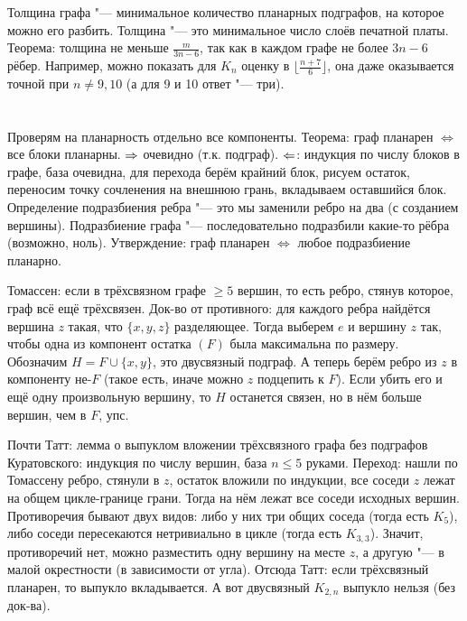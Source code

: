 	Толщина графа "--- минимальное количество планарных подграфов, на которое можно его разбить.
	Толщина "--- это минимальное число слоёв печатной платы.
	Теорема: толщина не меньше $\frac{m}{3n-6}$, так как в каждом графе не более $3n-6$ рёбер.
	Например, можно показать для $K_n$ оценку в $\lfloor\frac{n+7}{6}\rfloor$, она даже оказывается точной при $n \neq 9,10$
	(а для 9 и 10 ответ "--- три).

\section{} %
	Проверям на планарность отдельно все компоненты.
	Теорема: граф планарен $\iff$ все блоки планарны.
	$\Rightarrow$ очевидно (т.к. подграф).
	$\Leftarrow$: индукция по числу блоков в графе, база очевидна, для перехода берём крайний блок, рисуем остаток, переносим точку сочленения на внешнюю грань, вкладываем оставшийся блок.
	Определение подразбиения ребра "--- это мы заменили ребро на два (с созданием вершины).
	Подразбиение графа "--- последовательно подразбили какие-то рёбра (возможно, ноль).
	Утверждение: граф планарен $\iff$ любое подразбиение планарно.

	Томассен: если в трёхсвязном графе $\ge 5$ вершин, то есть ребро, стянув которое, граф всё ещё трёхсвязен.
	Док-во от противного: для каждого ребра найдётся вершина $z$ такая, что $\{x,y,z\}$ разделяющее.
	Тогда выберем $e$ и вершину $z$ так, чтобы одна из компонент остатка $(F)$ была максимальна по размеру.
	Обозначим $H=F\cup\{x, y\}$, это двусвязный подграф.
	А теперь берём ребро из $z$ в компоненту не-$F$ (такое есть, иначе можно $z$ подцепить к $F$).
	Если убить его и ещё одну произвольную вершину, то $H$ останется связен, но в нём больше вершин, чем в $F$, упс.

	Почти Татт:
	лемма о выпуклом вложении трёхсвязного графа без подграфов Куратовского: индукция по числу вершин, база $n \le 5$ руками.
	Переход: нашли по Томассену ребро, стянули в $z$, остаток вложили по индукции, все соседи $z$ лежат на общем цикле-границе грани.
	Тогда на нём лежат все соседи исходных вершин.
	Противоречия бывают двух видов: либо у них три общих соседа (тогда есть $K_5$), либо соседи пересекаются нетривиально в цикле (тогда есть $K_{3,3}$).
	Значит, противоречий нет, можно разместить одну вершину на месте $z$, а другую "--- в малой окрестности (в зависимости от угла).
	Отсюда Татт: если трёхсвязный планарен, то выпукло вкладывается.
	А вот двусвязный $K_{2,n}$ выпукло нельзя (без док-ва).


